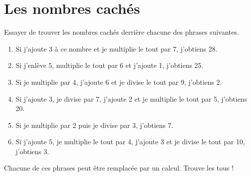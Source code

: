 \section*{Les nombres cachés}

Essayer de trouver les nombres cachés derrière chacune des phrases suivantes.

\begin{enumerate}
    \item Si j'ajoute 3 à ce nombre et je multiplie le tout par 7, j'obtiens 28.\vspace{0.75em}
    \item Si j'enlève 5, multiplie le tout par 6 et j'ajoute 1, j'obtiens 25.\vspace{0.75em}
    \item Si je multiplie par 4, j'ajoute 6 et je divise le tout par 9, j'obtiens 2.\vspace{0.75em}
    \item Si j'ajoute 3, je divise par 7, j'ajoute 2 et je multiplie le tout par 5, j'obtiens 20.\vspace{0.75em}
    \item Si je multiplie par 2 puis je divise par 3, j'obtiens 7.\vspace{0.75em}
    \item Si j'ajoute 5, je multiplie le tout par 4, j'ajoute 3 et je divise le tout par 10, j'obtiens 3.
\end{enumerate}

Chacune de ces phrases peut être remplacée par un calcul. Trouve les tous !